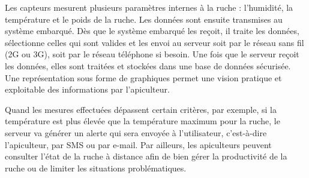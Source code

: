 Les capteurs mesurent plusieurs paramètres internes à la ruche : l'humidité, la température et le poids de la ruche. Les données sont ensuite transmises au système embarqué. Dès que le système embarqué les reçoit, il traite les données, sélectionne celles qui sont valides et les envoi au serveur soit par le réseau sans fil (2G ou 3G), soit par le réseau téléphone si besoin. Une fois que le serveur reçoit les données, elles sont traitées et stockées dans une base de données sécurisée. Une représentation sous forme de graphiques permet une vision pratique et exploitable des informations par l'apiculteur.

Quand les mesures effectuées dépassent certain critères, par exemple, si la température est plus élevée que la température maximum pour la ruche, le serveur va générer un alerte qui sera envoyée à l'utilisateur, c’est-à-dire l'apiculteur, par SMS ou par e-mail. Par ailleurs, les apiculteurs peuvent consulter l’état de la ruche à distance afin de bien gérer la productivité de la ruche ou de limiter les situations problématiques. 

